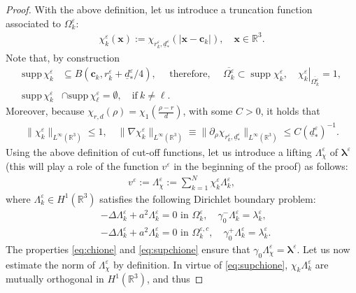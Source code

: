 \documentclass[]{article}
\numberwithin{equation}{section}
\numberwithin{theorem}{section}
\numberwithin{lemma}{section}
\numberwithin{corollary}{section}
\numberwithin{proposition}{section}
\numberwithin{definition}{section}
\newcommand{\re}{\varepsilon}
\renewcommand{\vec}{\boldsymbol}
\begin{document}
\begin{appendices}
\begin{proof}
			With the above definition, let us introduce a truncation function associated to $\Omega^{\re}_k$:
			\begin{align*}%
				\chi_k^{\re}(\boldsymbol{x}) := \chi_{r^{\re}_k, \underline{d}^{\re}_*} (|\boldsymbol{x} - \boldsymbol{c}_k|), \quad \boldsymbol{x} \in \mathbb{R}^3.
			\end{align*}	 	
			Note that, by construction 
			\begin{align}
				\label{eq:chione}
				\text{supp} \,\chi_k^{\re} &\subseteq B(\boldsymbol{c}_k, r^{\re}_k+\underline{d}^{\re}_*/4),\quad \text{ therefore, }\quad\overline{\Omega^{\re}_k}\subset \operatorname{supp}\chi_k^{\re},
				\quad 
				\left.\chi_k^{\re}\right|_{\overline{\Omega^{\re}_k}}=1,\\
				\label{eq:supchione}
				\text{supp}\,\chi_k^{\re}&  \cap \text{supp}\,\chi_{\ell}^{\re} = \emptyset, \quad \text{if}~k \neq \ell.
			\end{align} 
			Moreover, because $\chi_{r,d}(\rho)=\chi_1\left(\frac{\rho-r}{d}\right)$, with some $C>0$, it holds that  
			\begin{align}
				\label{eq:bounds_on_cut_off}
				\| \chi_k^{\re} \|_{L^{\infty}(\mathbb{R}^3)} \leq 1, \quad \| \nabla \chi_k^{\re} \|_{L^{\infty}(\mathbb{R}^3)}\equiv \|\partial_{\rho}\chi_{r_k^{\re}, \underline{d}^{\re}_*}\|_{L^{\infty}(\mathbb{R}^3)} \leq C (\underline{d}^{\re}_*)^{-1}.	
			\end{align}
			Using the above definition of cut-off functions, let us introduce a lifting $\Lambda^{\re}_{\chi}$ of $\vec{\lambda}^{\re}$ (this will play a role of the function $v^{\re}$ in the beginning of the proof) as follows:
			\begin{align*}%
				v^{\re}:=\Lambda^{\re}_{\chi} := \sum_{k=1}^N \chi_k^{\re} \Lambda^{\re}_k,
			\end{align*}
			where $\Lambda^{\re}_k \in H^{1}(\mathbb{R}^3)$ satisfies the following Dirichlet boundary problem:
			\begin{align*}%
				&- \Delta \Lambda^{\re}_k + a^2  \Lambda^{\re}_k = 0 \text{ in } \Omega^{\re}_k, \quad  \gamma^{-}_0 \Lambda^{\re}_k = \lambda^{\re}_k, \\
				&- \Delta \Lambda^{\re}_k + a^2  \Lambda^{\re}_k = 0 \text{ in } \Omega^{\re, c}_k, \quad  \gamma^{+}_0 \Lambda^{\re}_k = \lambda^{\re}_k.
			\end{align*}
			The properties \eqref{eq:chione} and \eqref{eq:supchione} ensure that  $\gamma_0\Lambda_{\chi}^{\re}=\vec{\lambda}^{\re}$. Let us now estimate the norm of $\Lambda^{\re}_{\chi}$ by definition. In virtue of \eqref{eq:supchione}, $\chi_k\Lambda^{\re}_k$ are mutually orthogonal in $H^1(\mathbb{R}^3)$, and thus 

\end{proof}
\end{appendices}
\end{document}
